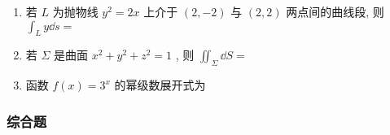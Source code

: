 \begin{enumerate}
	\item 若 $L$ 为抛物线 $y^2=2x$ 上介于 $(2,-2)$ 与 $(2,2)$ 两点间的曲线段, 则 $\int_{L} y\dd s=$\underline{\hspace{8pc}}
	
	\item 若 $\Sigma$ 是曲面 $x^2+y^2+z^2=1$ , 则 $\iint_{\Sigma} \dd S=$\underline{\hspace{8pc}}
	
	\item 函数 $f(x)=3^x$ 的幂级数展开式为\underline{\hspace{8pc}}
\end{enumerate}

\subsubsection{综合题}
